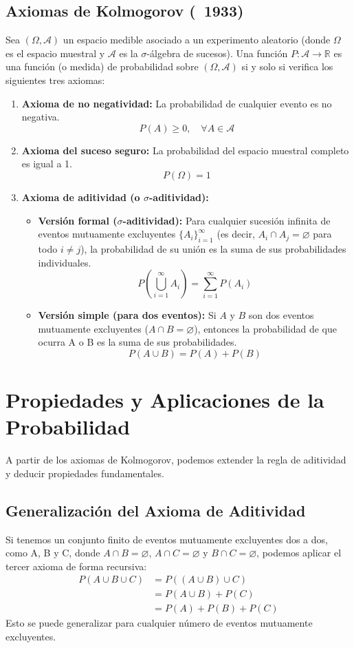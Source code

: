 \documentclass[12pt, letterpaper]{article}
\begin{document}
\subsection{Axiomas de Kolmogorov (~1933)}
Sea $(\Omega, \mathcal{A})$ un espacio medible asociado a un experimento aleatorio (donde $\Omega$ es el espacio muestral y $\mathcal{A}$ es la $\sigma$-álgebra de sucesos).
Una función $P: \mathcal{A} \rightarrow \mathbb{R}$ es una función (o medida) de probabilidad sobre $(\Omega, \mathcal{A})$ si y solo si verifica los siguientes tres axiomas:

\begin{enumerate}[label=\textbf{A\arabic*:}]
	\item \textbf{Axioma de no negatividad:} La probabilidad de cualquier evento es no negativa.
	      \[ P(A) \ge 0, \quad \forall A \in \mathcal{A} \]
	\item \textbf{Axioma del suceso seguro:} La probabilidad del espacio muestral completo es igual a 1.
	      \[ P(\Omega) = 1 \]
	\item \textbf{Axioma de aditividad (o $\sigma$-aditividad):}
	      \begin{itemize}
		      \item \textbf{Versión formal ($\sigma$-aditividad):} Para cualquier sucesión infinita de eventos mutuamente excluyentes $\{A_i\}_{i=1}^{\infty}$ (es decir, $A_i \cap A_j = \varnothing$ para todo $i \neq j$), la probabilidad de su unión es la suma de sus probabilidades individuales.
		            \[ P\left(\bigcup_{i=1}^{\infty} A_i\right) = \sum_{i=1}^{\infty} P(A_i) \]
		      \item \textbf{Versión simple (para dos eventos):} Si $A$ y $B$ son dos eventos mutuamente excluyentes ($A \cap B = \varnothing$), entonces la probabilidad de que ocurra A o B es la suma de sus probabilidades.
		            \[ P(A \cup B) = P(A) + P(B) \]
	      \end{itemize}
\end{enumerate}
\newpage


\section{Propiedades y Aplicaciones de la Probabilidad}
A partir de los axiomas de Kolmogorov, podemos extender la regla de aditividad y deducir propiedades fundamentales.

\subsection{Generalización del Axioma de Aditividad}
Si tenemos un conjunto finito de eventos mutuamente excluyentes dos a dos, como A, B y C, donde $A \cap B = \varnothing$, $A \cap C = \varnothing$ y $B \cap C = \varnothing$, podemos aplicar el tercer axioma de forma recursiva:
\begin{align*}
	P(A \cup B \cup C) & = P((A \cup B) \cup C) \\
	                   & = P(A \cup B) + P(C)   \\
	                   & = P(A) + P(B) + P(C)
\end{align*}
Esto se puede generalizar para cualquier número de eventos mutuamente excluyentes.
\end{document}
